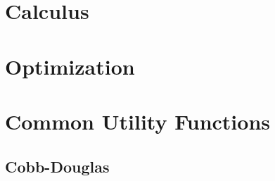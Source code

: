 \documentclass{article}
\begin{document}
 

\newpage

\section{Calculus}
\label{sec:calculus}



\newpage
\section{Optimization}
\label{sec:optimization}



\newpage

\section{Common Utility Functions}
\label{sec:comm-util-funct}

\subsection{Cobb-Douglas}
\label{sec:cobb-douglas}
\end{document}
